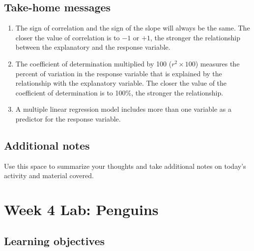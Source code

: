 \documentclass[
]{report}
\begin{document}
\vspace{0.8in}

\hypertarget{take-home-messages-8}{%
\subsection{Take-home messages}\label{take-home-messages-8}}

\begin{enumerate}
\def\labelenumi{\arabic{enumi}.}
\item
  The sign of correlation and the sign of the slope will always be the same. The closer the value of correlation is to \(-1\) or \(+1\), the stronger the relationship between the explanatory and the response variable.
\item
  The coefficient of determination multiplied by 100 (\(r^2 \times 100\)) measures the percent of variation in the response variable that is explained by the relationship with the explanatory variable. The closer the value of the coefficient of determination is to 100\%, the stronger the relationship.
\item
  A multiple linear regression model includes more than one variable as a predictor for the response variable.
\end{enumerate}

\hypertarget{additional-notes-8}{%
\subsection{Additional notes}\label{additional-notes-8}}

Use this space to summarize your thoughts and take additional notes on today's activity and material covered.

\newpage

\hypertarget{week-4-lab-penguins}{%
\section{Week 4 Lab: Penguins}\label{week-4-lab-penguins}}


\hypertarget{learning-objectives-5}{%
\subsection{Learning objectives}\label{learning-objectives-5}}
\end{document}
